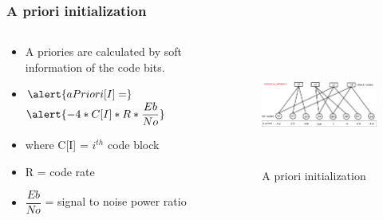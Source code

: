 \documentclass[xcolor=dvipsname]
{beamer}
\begin{document}
\begin{frame}[t]
\frametitle{ A priori initialization }  
\begin{columns}[totalwidth=\textwidth]
	\begin{column}{0.4\textwidth}
	\centering
	\begin{itemize}
	\item A priories are calculated by soft information of the code bits.	
	\item 	$
	\alert{aPriori[I] =}
	$
	$
	\alert{ -4 * C[I] * R * \dfrac{Eb}{No}}
	$ 
	\item where C[I] = $i^{th}$ code block
	\item R = code rate
	\item $\dfrac{Eb}{No}$ = signal to noise power ratio
	\end{itemize}
 
			
	\end{column}%
	   		
	\begin{column}{0.6\textwidth}
	\centering
	\begin{figure}
	\includegraphics[height=4cm,width=7cm]{minSum2}
	\caption{ A priori initialization }
	\end{figure}
	\end{column}%
\end{columns}
\end{frame}


\end{document}
